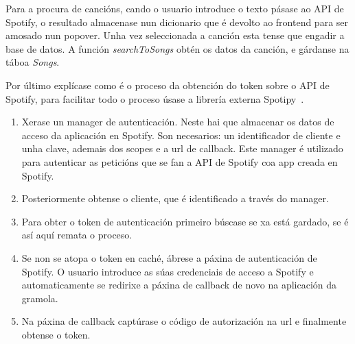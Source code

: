 Para a procura de cancións, cando o usuario introduce o texto pásase ao API de Spotify, o resultado almacenase nun dicionario que é devolto ao frontend para ser amosado nun popover. Unha vez seleccionada a canción esta tense que engadir a base de datos. A función \textit{searchToSongs} obtén os datos da canción, e gárdanse na táboa \textit{Songs}.

Por último explícase como é o proceso da obtención do token sobre o API de Spotify, para facilitar todo o proceso úsase a librería externa Spotipy~\cite{spotipy}.

\begin{enumerate}
	\item Xerase un manager de autenticación. Neste hai que almacenar os datos de acceso da aplicación en Spotify. Son necesarios: un identificador de cliente e unha clave, ademais dos scopes e a url de callback. Este manager é utilizado para autenticar as peticións que se fan a API de Spotify coa app creada en Spotify.
	\item Posteriormente obtense o cliente, que é identificado a través do manager.
	\item Para obter o token de autenticación primeiro búscase se xa está gardado, se é así aquí remata o proceso.
	\item Se non se atopa o token en caché, ábrese a páxina de autenticación de Spotify. O usuario introduce as súas credenciais de acceso a Spotify e automaticamente se redirixe a páxina de callback de novo na aplicación da gramola.
	\item Na páxina de callback captúrase o código de autorización na url e finalmente obtense o token.
\end{enumerate}

